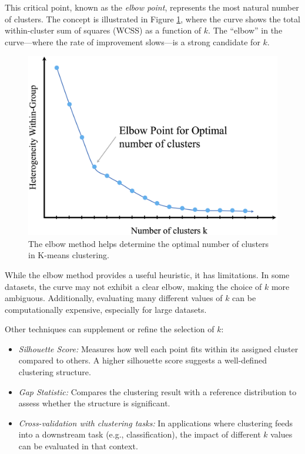 \documentclass[
  11pt,
]{book}
\providecommand{\tightlist}{%
  \setlength{\itemsep}{0pt}\setlength{\parskip}{0pt}}
\theoremstyle{definition}
\theoremstyle{definition}
\theoremstyle{definition}
\theoremstyle{definition}
\theoremstyle{remark}
\begin{document}
This critical point, known as the \emph{elbow point}, represents the most natural number of clusters. The concept is illustrated in Figure \ref{fig:cluster-elbow}, where the curve shows the total within-cluster sum of squares (WCSS) as a function of \(k\). The ``elbow'' in the curve---where the rate of improvement slows---is a strong candidate for \(k\).

\begin{figure}[H]

{\centering \includegraphics[width=0.6\linewidth]{images/ch13_cluster_elbow} 

}

\caption{The elbow method helps determine the optimal number of clusters in K-means clustering.}\label{fig:cluster-elbow}
\end{figure}

While the elbow method provides a useful heuristic, it has limitations. In some datasets, the curve may not exhibit a clear elbow, making the choice of \(k\) more ambiguous. Additionally, evaluating many different values of \(k\) can be computationally expensive, especially for large datasets.

Other techniques can supplement or refine the selection of \(k\):

\begin{itemize}
\tightlist
\item
  \emph{Silhouette Score:} Measures how well each point fits within its assigned cluster compared to others. A higher silhouette score suggests a well-defined clustering structure.\\
\item
  \emph{Gap Statistic:} Compares the clustering result with a reference distribution to assess whether the structure is significant.\\
\item
  \emph{Cross-validation with clustering tasks:} In applications where clustering feeds into a downstream task (e.g., classification), the impact of different \(k\) values can be evaluated in that context.
\end{itemize}
\end{document}
